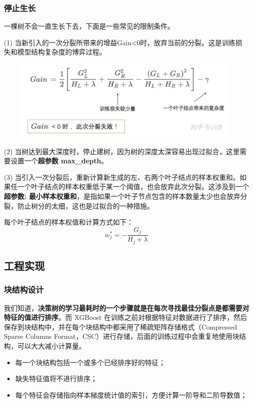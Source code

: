 \documentclass[12pt]{article}
\begin{document}
\subsubsection{停止生长}
一棵树不会一直生长下去，下面是一些常见的限制条件。

(1) 当新引入的一次分裂所带来的增益Gain<0时，放弃当前的分裂。这是训练损失和模型结构复杂度的博弈过程。
\begin{figure}[H]
    \centering
    \includegraphics[width=1\textwidth]{fig/XGBoost_Tree_Eq_Node_Split_Stop_1.png}
\end{figure}

(2) 当树达到最大深度时，停止建树，因为树的深度太深容易出现过拟合，这里需要设置一个\textbf{超参数 max\_depth}。

(3) 当引入一次分裂后，重新计算新生成的左、右两个叶子结点的样本权重和。如果任一个叶子结点的样本权重低于某一个阈值，也会放弃此次分裂。这涉及到一个\textbf{超参数: 最小样本权重和}，是指如果一个叶子节点包含的样本数量太少也会放弃分裂，防止树分的太细，这也是过拟合的一种措施。

每个叶子结点的样本权值和计算方式如下：
$$
w^*_j = -\frac{G_j}{H_j + \lambda}
$$

\subsection{工程实现}
\subsubsection{块结构设计}
我们知道，\textbf{决策树的学习最耗时的一个步骤就是在每次寻找最佳分裂点是都需要对特征的值进行排序}。而 XGBoost 在训练之前对根据特征对数据进行了排序，然后保存到块结构中，并在每个块结构中都采用了稀疏矩阵存储格式（Compressed Sparse Columns Format，CSC）进行存储，后面的训练过程中会重复地使用块结构，可以大大减小计算量。
\begin{itemize}
\setlength{\itemsep}{0pt}
\setlength{\parsep}{0pt}
\setlength{\parskip}{0pt}
    \item 每一个块结构包括一个或多个已经排序好的特征；
    \item 缺失特征值将不进行排序；
    \item 每个特征会存储指向样本梯度统计值的索引，方便计算一阶导和二阶导数值；
\end{itemize}
\end{document}
